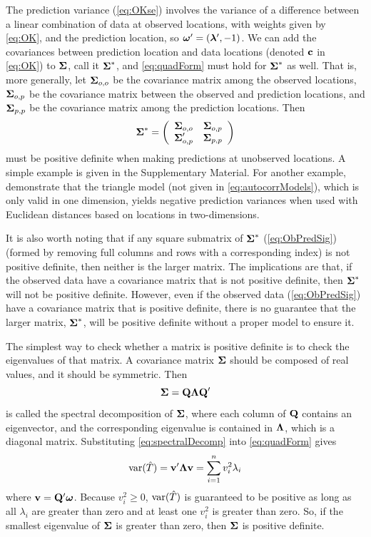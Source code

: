 \documentclass[11pt, titlepage]{article}\usepackage[]{graphicx}\usepackage[]{color}
\begin{document}
\begin{spacing}{1.9}
\begin{flushleft}
The prediction variance (\ref{eq:OKse}) involves the variance of a difference between a linear combination of data at observed locations, with weights given by \ref{eq:OK}, and the prediction location, so $\mbox{\boldmath $\omega$}^{\prime} = ({\boldsymbol{\lambda}}^{\prime},-1)$. We can add the covariances between prediction location and data locations (denoted $\mathbf{c}$ in \ref{eq:OK}) to $\mbox{\boldmath $\Sigma$}$, call it $\mbox{\boldmath $\Sigma$}^*$, and \ref{eq:quadForm} must hold for $\mbox{\boldmath $\Sigma$}^*$ as well. That is, more generally, let $\mbox{\boldmath $\Sigma$}_{o,o}$ be the covariance matrix among the observed locations, $\mbox{\boldmath $\Sigma$}_{o,p}$ be the covariance matrix between the observed and prediction locations, and $\mbox{\boldmath $\Sigma$}_{p,p}$  be the covariance matrix among the prediction locations. Then
\begin{equation} \label{eq:ObPredSig}
				\mbox{\boldmath $\Sigma$}^* = \left(
					\begin{array}{cc}
									\mbox{\boldmath $\Sigma$}_{o,o} & \mbox{\boldmath $\Sigma$}_{o,p} \\
									\mbox{\boldmath $\Sigma$}_{o,p}^{\prime} & \mbox{\boldmath $\Sigma$}_{p,p}
					\end{array}
				\right)
\end{equation}
must be positive definite when making predictions at unobserved locations. A simple example is given in the Supplementary Material. For another example, \citet{Guil:Schi:Porc:Bevi:vali:2014} demonstrate that the triangle model (not given in \ref{eq:autocorrModels}), which is only valid in one dimension, yields negative prediction variances when used with Euclidean distances based on locations in two-dimensions.  

It is also worth noting that if any square submatrix of $\mbox{\boldmath $\Sigma$}^*$ (\ref{eq:ObPredSig}) (formed by removing full columns and rows with a corresponding index) is not positive definite, then neither is the larger matrix.  The implications are that, if the observed data have a covariance matrix that is not positive definite, then $\mbox{\boldmath $\Sigma$}^*$ will not be positive definite.  However, even if the observed data (\ref{eq:ObPredSig}) have a covariance matrix that is positive definite, there is no guarantee that the larger matrix, $\mbox{\boldmath $\Sigma$}^*$, will be positive definite without a proper model to ensure it.

The simplest way to check whether a matrix is positive definite is to check the eigenvalues of that matrix.  A covariance matrix $\mbox{\boldmath $\Sigma$}$ should be composed of real values, and it should be symmetric.  Then 
\begin{equation} \label{eq:spectralDecomp}
  \mbox{\boldmath $\Sigma$} = \mathbf{Q}\mbox{\boldmath $\Lambda$}\mathbf{Q}^{\prime}
\end{equation}
is called the spectral decomposition of $\mbox{\boldmath $\Sigma$}$, where each column of $\mathbf{Q}$ contains an eigenvector, and the corresponding eigenvalue is contained in $\mbox{\boldmath $\Lambda$}$, which is a diagonal matrix.  Substituting \ref{eq:spectralDecomp} into \ref{eq:quadForm} gives
\[
\textrm{var}(\hat{T}) = \mathbf{v}^{\prime}\mbox{\boldmath $\Lambda$}\mathbf{v} = \sum_{i=1}^n v_i^2\lambda_i
\]
where $\mathbf{v} = \mathbf{Q}^{\prime}\mbox{\boldmath $\omega$}$. Because $v_i^2 \ge 0$, $\textrm{var}(\hat{T})$ is guaranteed to be positive as long as all $\lambda_i$ are greater than zero and at least one $v_i^2$ is greater than zero.  So, if the smallest eigenvalue of $\mbox{\boldmath $\Sigma$}$ is greater than zero, then $\mbox{\boldmath $\Sigma$}$ is positive definite.


\end{flushleft}
\end{spacing}
\end{document}
